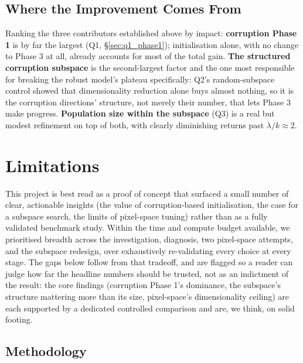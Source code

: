 \documentclass[11pt, a4paper]{article}
\begin{document}
\subsection{Where the Improvement Comes From}

Ranking the three contributors established above by impact: \textbf{corruption Phase 1} is by far the largest (Q1, \S\ref{sec:q1_phase1}); initialisation alone, with no change to Phase 3 at all, already accounts for most of the total gain. \textbf{The structured corruption subspace} is the second-largest factor and the one most responsible for breaking the robust model's plateau specifically: Q2's random-subspace control showed that dimensionality reduction alone buys almost nothing, so it is the corruption directions' structure, not merely their number, that lets Phase 3 make progress. \textbf{Population size within the subspace} (Q3) is a real but modest refinement on top of both, with clearly diminishing returns past $\lambda/k\approx2$.

\section{Limitations}
\label{sec:limitations}

This project is best read as a proof of concept that surfaced a small number of clear, actionable insights (the value of corruption-based initialisation, the case for a subspace search, the limits of pixel-space tuning) rather than as a fully validated benchmark study. Within the time and compute budget available, we prioritised breadth across the investigation, diagnosis, two pixel-space attempts, and the subspace redesign, over exhaustively re-validating every choice at every stage. The gaps below follow from that tradeoff, and are flagged so a reader can judge how far the headline numbers should be trusted, not as an indictment of the result: the core findings (corruption Phase 1's dominance, the subspace's structure mattering more than its size, pixel-space's dimensionality ceiling) are each supported by a dedicated controlled comparison and are, we think, on solid footing.

\subsection{Methodology}
\end{document}
